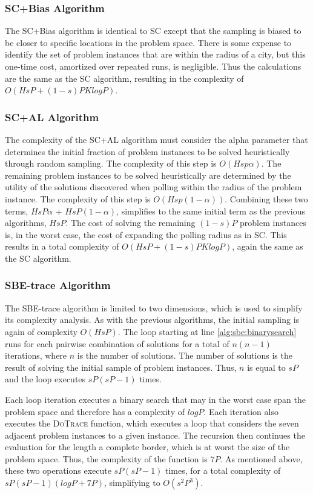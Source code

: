 \subsubsection{SC+Bias Algorithm} The SC+Bias algorithm is identical to SC except that the sampling is biased to be closer to specific locations in the problem space. There is some expense to identify the set of problem instances that are within the radius of a city, but this one-time cost, amortized over repeated runs, is negligible.  Thus the calculations are the same as the SC algorithm, resulting in the complexity of $O(HsP + (1-s)PKlogP)$.

\subsubsection{SC+AL Algorithm} The complexity of the SC+AL algorithm must consider the alpha parameter that determines the initial fraction of problem instances  to be solved heuristically through random sampling.  The complexity of this step is $O(Hsp\alpha)$.  The remaining problem instances to be solved heuristically are determined by the  utility of the solutions discovered when polling within the radius of the problem instance.  The complexity of this step is $O(Hsp(1-\alpha))$.  Combining these two terms,  $HsP\alpha$ + $HsP(1-\alpha)$, simplifies to the same initial term as the previous algorithms, $HsP$.  The cost of solving the remaining $(1-s)P$ problem instances is, in the worst case, the cost of expanding the polling radius as in SC.  This results in a total complexity of $O(HsP + (1-s)PKlogP)$, again the same as the SC algorithm.

\subsubsection{SBE-trace Algorithm} The SBE-trace algorithm is limited to two dimensions, which is used to simplify its complexity analysis.  As with the previous algorithms, the initial sampling  is again of complexity $O(HsP)$.  The loop starting at line \ref{alg:sbe:binarysearch} runs for each pairwise combination of solutions for a total of $n(n-1)$ iterations, where $n$ is the number of solutions.  The number of solutions is the result of solving the initial sample of problem instances. Thus, $n$ is equal to $sP$ and the loop executes $sP(sP-1)$ times.

Each loop iteration executes a binary search that may in the worst case span the problem space and therefore has a complexity of $logP$.  Each iteration also executes the \textsc{DoTrace} function, which executes a loop that considers the seven adjacent problem instances to a given instance.  The recursion then continues the evaluation for the length a complete border, which is at worst the size of the problem space.  Thus, the complexity of the function is $7P$.  As mentioned above, these two operations execute $sP(sP-1)$ times, for a total complexity of $sP(sP-1)(logP + 7P)$, simplifying to $O(s^2P^3)$.

